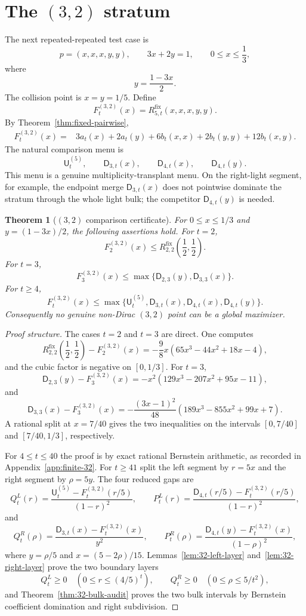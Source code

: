 \documentclass[11pt]{article}
\newtheorem{theorem}{Theorem}[section]
\theoremstyle{definition}
\newcommand{\fix}{\mathrm{fix}}
\begin{document}
\section{The $(3,2)$ stratum}\label{sec:threetwo}

The next repeated-repeated test case is
\[
  p=(x,x,x,y,y),
  \qquad 3x+2y=1,
  \qquad 0\le x\le\frac13,
\]
where
\[
  y=\frac{1-3x}{2}.
\]
The collision point is $x=y=1/5$.  Define
\[
  F^{(3,2)}_t(x)=R_{5,t}^{\fix}(x,x,x,y,y).
\]
By Theorem~\ref{thm:fixed-pairwise},
\[
\begin{aligned}
F^{(3,2)}_t(x)
={}&3a_t(x)+2a_t(y)+6b_t(x,x)+2b_t(y,y)+12b_t(x,y).
\end{aligned}
\]
The natural comparison menu is
\[
  \mathsf U^{(5)}_t,
  \qquad \mathsf D_{3,t}(x),
  \qquad \mathsf D_{4,t}(x),
  \qquad \mathsf D_{4,t}(y).
\]
This menu is a genuine multiplicity-transplant menu.  On the right-light
segment, for example, the endpoint merge $\mathsf D_{3,t}(x)$ does not
pointwise dominate the stratum through the whole light bulk; the competitor
$\mathsf D_{4,t}(y)$ is needed.

\begin{theorem}[$(3,2)$ comparison certificate]\label{thm:threetwo}
For $0\le x\le1/3$ and $y=(1-3x)/2$, the following assertions hold.
For $t=2$,
\[
  F^{(3,2)}_2(x)
  \le R_{2,2}^{\fix}\left(\frac12,\frac12\right).
\]
For $t=3$,
\[
  F^{(3,2)}_3(x)
  \le \max\{\mathsf D_{2,3}(y),\mathsf D_{3,3}(x)\}.
\]
For $t\ge4$,
\[
  F^{(3,2)}_t(x)
  \le
  \max\{\mathsf U^{(5)}_t,\mathsf D_{3,t}(x),
          \mathsf D_{4,t}(x),\mathsf D_{4,t}(y)\}.
\]
Consequently no genuine non-Dirac $(3,2)$ point can be a global maximizer.
\end{theorem}

\begin{proof}[Proof structure]
The cases $t=2$ and $t=3$ are direct.  One computes
\[
  R_{2,2}^{\fix}\left(\frac12,\frac12\right)-F^{(3,2)}_2(x)
  =-\frac98 x(65x^3-44x^2+18x-4),
\]
and the cubic factor is negative on $[0,1/3]$.  For $t=3$,
\[
  \mathsf D_{2,3}(y)-F^{(3,2)}_3(x)
  =-x^2(129x^3-207x^2+95x-11),
\]
and
\[
  \mathsf D_{3,3}(x)-F^{(3,2)}_3(x)
  =-\frac{(3x-1)^2}{48}(189x^3-855x^2+99x+7).
\]
A rational split at $x=7/40$ gives the two inequalities on the intervals
$[0,7/40]$ and $[7/40,1/3]$, respectively.

For $4\le t\le40$ the proof is by exact rational Bernstein arithmetic, as
recorded in Appendix~\ref{app:finite-32}.  For $t\ge41$ split the left
segment by $r=5x$ and the right segment by $\rho=5y$.  The four reduced gaps
are
\[
  Q^L_t(r)=\frac{\mathsf U^{(5)}_t-F^{(3,2)}_t(r/5)}{(1-r)^2},
  \qquad
  P^L_t(r)=\frac{\mathsf D_{4,t}(r/5)-F^{(3,2)}_t(r/5)}{(1-r)^2},
\]
and
\[
  Q^R_t(\rho)=\frac{\mathsf D_{3,t}(x)-F^{(3,2)}_t(x)}{y^2},
  \qquad
  P^R_t(\rho)=\frac{\mathsf D_{4,t}(y)-F^{(3,2)}_t(x)}{(1-\rho)^2},
\]
where $y=\rho/5$ and $x=(5-2\rho)/15$.  Lemmas~\ref{lem:32-left-layer}
and~\ref{lem:32-right-layer} prove the two boundary layers
\[
  Q^L_t\ge0\quad(0\le r\le(4/5)^t),
  \qquad
  Q^R_t\ge0\quad(0\le\rho\le5/t^2),
\]
and Theorem~\ref{thm:32-bulk-audit} proves the two bulk intervals by
Bernstein coefficient domination and right subdivision.
\end{proof}
\end{document}
